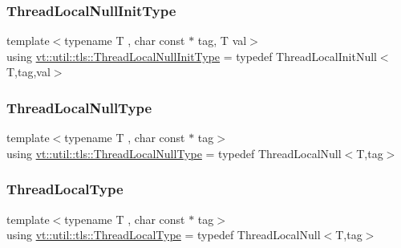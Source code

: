 \mbox{\label{namespacevt_1_1util_1_1tls_a1c2a3e3055912db5cfa8df4b224d120c}} 
\subsubsection{\texorpdfstring{Thread\+Local\+Null\+Init\+Type}{ThreadLocalNullInitType}}
{\footnotesize\ttfamily template$<$typename T , char const $\ast$ tag, T val$>$ \\
using \hyperlink{namespacevt_1_1util_1_1tls_a1c2a3e3055912db5cfa8df4b224d120c}{vt\+::util\+::tls\+::\+Thread\+Local\+Null\+Init\+Type} = typedef Thread\+Local\+Init\+Null$<$T,tag,val$>$}

\mbox{\label{namespacevt_1_1util_1_1tls_aac9e7187a0a292093620b94d81a650eb}} 
\subsubsection{\texorpdfstring{Thread\+Local\+Null\+Type}{ThreadLocalNullType}}
{\footnotesize\ttfamily template$<$typename T , char const $\ast$ tag$>$ \\
using \hyperlink{namespacevt_1_1util_1_1tls_aac9e7187a0a292093620b94d81a650eb}{vt\+::util\+::tls\+::\+Thread\+Local\+Null\+Type} = typedef Thread\+Local\+Null$<$T,tag$>$}

\mbox{\label{namespacevt_1_1util_1_1tls_a94b958a6b8516d7a65f5197dd7f8b8ef}} 
\subsubsection{\texorpdfstring{Thread\+Local\+Type}{ThreadLocalType}}
{\footnotesize\ttfamily template$<$typename T , char const $\ast$ tag$>$ \\
using \hyperlink{namespacevt_1_1util_1_1tls_a94b958a6b8516d7a65f5197dd7f8b8ef}{vt\+::util\+::tls\+::\+Thread\+Local\+Type} = typedef Thread\+Local\+Null$<$T,tag$>$}

